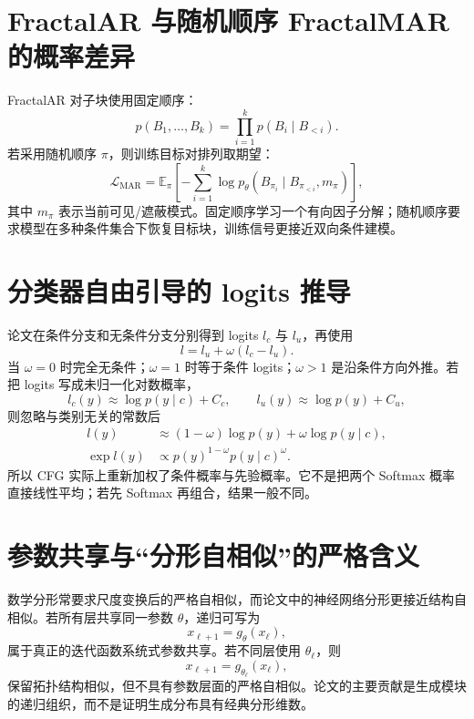 \documentclass[UTF8,12pt,a4paper,fontset=none]{ctexart}
\numberwithin{equation}{section}
\newcommand{\E}{\mathbb{E}}
\newcommand{\Loss}{\mathcal{L}}
\begin{document}
\section{FractalAR 与随机顺序 FractalMAR 的概率差异}
FractalAR 对子块使用固定顺序：
\begin{equation}
 p(B_1,\ldots,B_k)=\prod_{i=1}^{k}p(B_i\mid B_{<i}).
\end{equation}
若采用随机顺序 $\pi$，则训练目标对排列取期望：
\begin{equation}
 \Loss_{\mathrm{MAR}}
 =\E_{\pi}\left[-\sum_{i=1}^{k}
 \log p_\theta\!\left(B_{\pi_i}\mid B_{\pi_{<i}},m_\pi\right)\right],
\end{equation}
其中 $m_\pi$ 表示当前可见/遮蔽模式。固定顺序学习一个有向因子分解；随机顺序要求模型在多种条件集合下恢复目标块，训练信号更接近双向条件建模。

\section{分类器自由引导的 logits 推导}
论文在条件分支和无条件分支分别得到 logits $l_c$ 与 $l_u$，再使用
\begin{equation}
 \boxed{l=l_u+\omega(l_c-l_u)}.
\end{equation}
当 $\omega=0$ 时完全无条件；$\omega=1$ 时等于条件 logits；$\omega>1$ 是沿条件方向外推。若把 logits 写成未归一化对数概率，
\begin{equation}
 l_c(y)\approx \log p(y\mid c)+C_c,\qquad
 l_u(y)\approx \log p(y)+C_u,
\end{equation}
则忽略与类别无关的常数后
\begin{align}
 l(y)
 &\approx (1-\omega)\log p(y)+\omega\log p(y\mid c),\\
 \exp l(y)
 &\propto p(y)^{1-\omega}p(y\mid c)^\omega.
\end{align}
所以 CFG 实际上重新加权了条件概率与先验概率。它不是把两个 Softmax 概率直接线性平均；若先 Softmax 再组合，结果一般不同。

\section{参数共享与“分形自相似”的严格含义}
数学分形常要求尺度变换后的严格自相似，而论文中的神经网络分形更接近结构自相似。若所有层共享同一参数 $\theta$，递归可写为
\begin{equation}
 x_{\ell+1}=g_\theta(x_\ell),
\end{equation}
属于真正的迭代函数系统式参数共享。若不同层使用 $\theta_\ell$，则
\begin{equation}
 x_{\ell+1}=g_{\theta_\ell}(x_\ell),
\end{equation}
保留拓扑结构相似，但不具有参数层面的严格自相似。论文的主要贡献是生成模块的递归组织，而不是证明生成分布具有经典分形维数。
\end{document}
